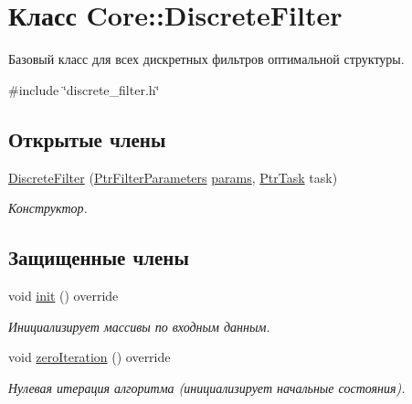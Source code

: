 \hypertarget{class_core_1_1_discrete_filter}{}\section{Класс Core\+:\+:Discrete\+Filter}
\label{class_core_1_1_discrete_filter}


Базовый класс для всех дискретных фильтров оптимальной структуры.  




{\ttfamily \#include \char`\"{}discrete\+\_\+filter.\+h\char`\"{}}

\subsection*{Открытые члены}
\begin{DoxyCompactItemize}
\item 
\hyperlink{class_core_1_1_discrete_filter_a87399ba405c2dfe8037191fe907df141}{Discrete\+Filter} (\hyperlink{namespace_core_a4811af8148ba137d644b9a61a042cf03}{Ptr\+Filter\+Parameters} \hyperlink{class_core_1_1_filter_a44aa749b49ba46256975ce545531ecf7}{params}, \hyperlink{namespace_core_abfda8f69fcacfcea2696549b548ed737}{Ptr\+Task} task)\hypertarget{class_core_1_1_discrete_filter_a87399ba405c2dfe8037191fe907df141}{}\label{class_core_1_1_discrete_filter_a87399ba405c2dfe8037191fe907df141}

\begin{DoxyCompactList}\small\item\em Конструктор. \end{DoxyCompactList}\end{DoxyCompactItemize}
\subsection*{Защищенные члены}
\begin{DoxyCompactItemize}
\item 
void \hyperlink{class_core_1_1_discrete_filter_a0329df1e944a191bed6324958587c194}{init} () override\hypertarget{class_core_1_1_discrete_filter_a0329df1e944a191bed6324958587c194}{}\label{class_core_1_1_discrete_filter_a0329df1e944a191bed6324958587c194}

\begin{DoxyCompactList}\small\item\em Инициализирует массивы по входным данным. \end{DoxyCompactList}\item 
void \hyperlink{class_core_1_1_discrete_filter_a658617c64c7067bb6b98b5e9d78f982e}{zero\+Iteration} () override
\begin{DoxyCompactList}\small\item\em Нулевая итерация алгоритма (инициализирует начальные состояния). \end{DoxyCompactList}\end{DoxyCompactItemize}
